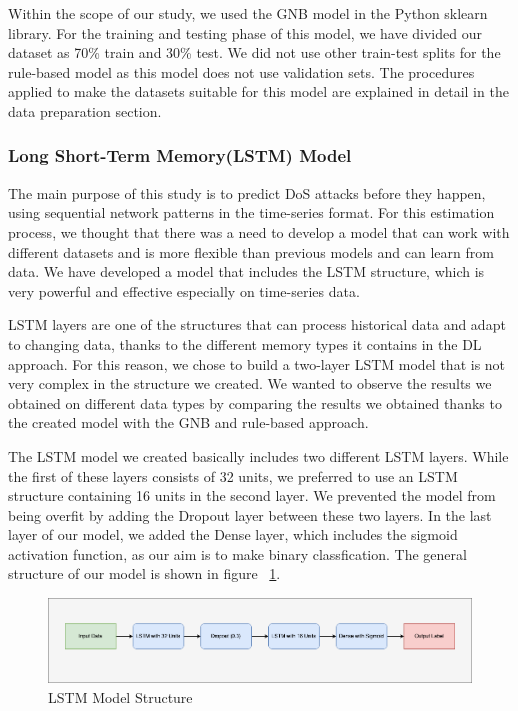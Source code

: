 \documentclass{article}
\begin{document}
Within the scope of our study, we used the GNB model in the Python sklearn library. For the training and testing phase of this model, we have divided our dataset as 70\% train and 30\% test. We did not use other train-test splits for the rule-based model as this model does not use validation sets. The procedures applied to make the datasets suitable for this model are explained in detail in the data preparation section.

\subsubsection{Long Short-Term Memory(LSTM) Model}

The main purpose of this study is to predict DoS attacks before they happen, using sequential network patterns in the time-series format. For this estimation process, we thought that there was a need to develop a model that can work with different datasets and is more flexible than previous models and can learn from data. We have developed a model that includes the LSTM structure, which is very powerful and effective especially on time-series data.

LSTM layers are one of the structures that can process historical data and adapt to changing data, thanks to the different memory types it contains in the DL approach. For this reason, we chose to build a two-layer LSTM model that is not very complex in the structure we created. We wanted to observe the results we obtained on different data types by comparing the results we obtained thanks to the created model with the GNB and rule-based approach.

The LSTM model we created basically includes two different LSTM layers. While the first of these layers consists of 32 units, we preferred to use an LSTM structure containing 16 units in the second layer. We prevented the model from being overfit by adding the Dropout layer between these two layers. In the last layer of our model, we added the Dense layer, which includes the sigmoid activation function, as our aim is to make binary classfication. The general structure of our model is shown in figure ~\ref{lstm-model}.

\begin{figure}
  \centering
  \includegraphics[width=\textwidth]{lstm_model.png}
  \caption{LSTM Model Structure}
  \label{lstm-model}
\end{figure}
\end{document}
